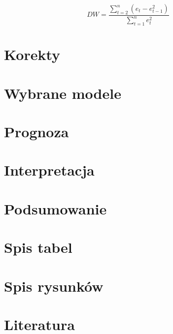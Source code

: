 \documentclass{article}
\begin{document}
\[DW = \frac{\sum_{t=2}^{n} (e_t-e_{t-1}^2)}{\sum_{t=1}^{n}e_t^2}\]

\section{Korekty}

\section{Wybrane modele}

\section{Prognoza}

\section{Interpretacja}

\section{Podsumowanie}

\newpage
\section{Spis tabel}
\renewcommand\listtablename{}
\listoftables


\newpage
\section{Spis rysunków}
\renewcommand\listfigurename{}
\listoffigures


\newpage
\section{Literatura}
\printbibliography[heading=none]
\end{document}
